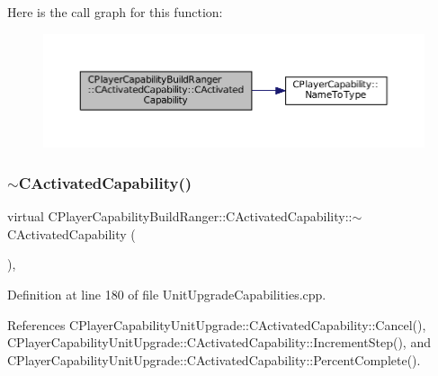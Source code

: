 Here is the call graph for this function\+:\nopagebreak
\begin{figure}[H]
\begin{center}
\leavevmode
\includegraphics[width=350pt]{classCPlayerCapabilityBuildRanger_1_1CActivatedCapability_a8b462671b0888c5374f4196b04d411d6_cgraph}
\end{center}
\end{figure}
\hypertarget{classCPlayerCapabilityBuildRanger_1_1CActivatedCapability_afd5d1ba5ad2b35faa67e4574627d46e1}{}\label{classCPlayerCapabilityBuildRanger_1_1CActivatedCapability_afd5d1ba5ad2b35faa67e4574627d46e1} 
\subsubsection{\texorpdfstring{$\sim$\+C\+Activated\+Capability()}{~CActivatedCapability()}}
{\footnotesize\ttfamily virtual C\+Player\+Capability\+Build\+Ranger\+::\+C\+Activated\+Capability\+::$\sim$\+C\+Activated\+Capability (\begin{DoxyParamCaption}{ }\end{DoxyParamCaption})\hspace{0.3cm}{\ttfamily [inline]}, {\ttfamily [virtual]}}



Definition at line 180 of file Unit\+Upgrade\+Capabilities.\+cpp.



References C\+Player\+Capability\+Unit\+Upgrade\+::\+C\+Activated\+Capability\+::\+Cancel(), C\+Player\+Capability\+Unit\+Upgrade\+::\+C\+Activated\+Capability\+::\+Increment\+Step(), and C\+Player\+Capability\+Unit\+Upgrade\+::\+C\+Activated\+Capability\+::\+Percent\+Complete().


